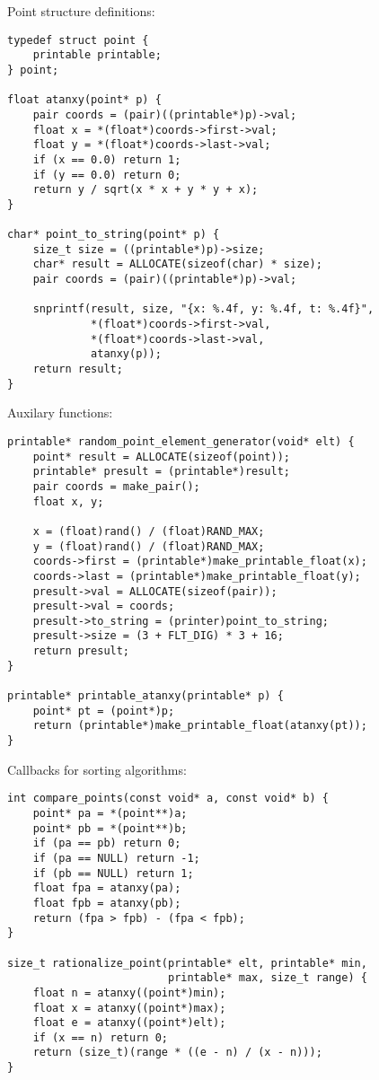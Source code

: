 \documentclass[11pt]{article}
\begin{document}
Point structure definitions:
\lstset{language=C,label= ,caption= ,numbers=none}
\begin{lstlisting}
typedef struct point {
    printable printable;
} point;

float atanxy(point* p) {
    pair coords = (pair)((printable*)p)->val;
    float x = *(float*)coords->first->val;
    float y = *(float*)coords->last->val;
    if (x == 0.0) return 1;
    if (y == 0.0) return 0;
    return y / sqrt(x * x + y * y + x);
}

char* point_to_string(point* p) {
    size_t size = ((printable*)p)->size;
    char* result = ALLOCATE(sizeof(char) * size);
    pair coords = (pair)((printable*)p)->val;

    snprintf(result, size, "{x: %.4f, y: %.4f, t: %.4f}",
             *(float*)coords->first->val,
             *(float*)coords->last->val,
             atanxy(p));
    return result;
}
\end{lstlisting}

Auxilary functions:
\lstset{language=C,label= ,caption= ,numbers=none}
\begin{lstlisting}
printable* random_point_element_generator(void* elt) {
    point* result = ALLOCATE(sizeof(point));
    printable* presult = (printable*)result;
    pair coords = make_pair();
    float x, y;

    x = (float)rand() / (float)RAND_MAX;
    y = (float)rand() / (float)RAND_MAX;
    coords->first = (printable*)make_printable_float(x);
    coords->last = (printable*)make_printable_float(y);
    presult->val = ALLOCATE(sizeof(pair));
    presult->val = coords;
    presult->to_string = (printer)point_to_string;
    presult->size = (3 + FLT_DIG) * 3 + 16;
    return presult;
}

printable* printable_atanxy(printable* p) {
    point* pt = (point*)p;
    return (printable*)make_printable_float(atanxy(pt));
}
\end{lstlisting}

\pagebreak

Callbacks for sorting algorithms:
\lstset{language=C,label= ,caption= ,numbers=none}
\begin{lstlisting}
int compare_points(const void* a, const void* b) {
    point* pa = *(point**)a;
    point* pb = *(point**)b;
    if (pa == pb) return 0;
    if (pa == NULL) return -1;
    if (pb == NULL) return 1;
    float fpa = atanxy(pa);
    float fpb = atanxy(pb);
    return (fpa > fpb) - (fpa < fpb);
}

size_t rationalize_point(printable* elt, printable* min,
                         printable* max, size_t range) {
    float n = atanxy((point*)min);
    float x = atanxy((point*)max);
    float e = atanxy((point*)elt);
    if (x == n) return 0;
    return (size_t)(range * ((e - n) / (x - n)));
}
\end{lstlisting}
\end{document}
